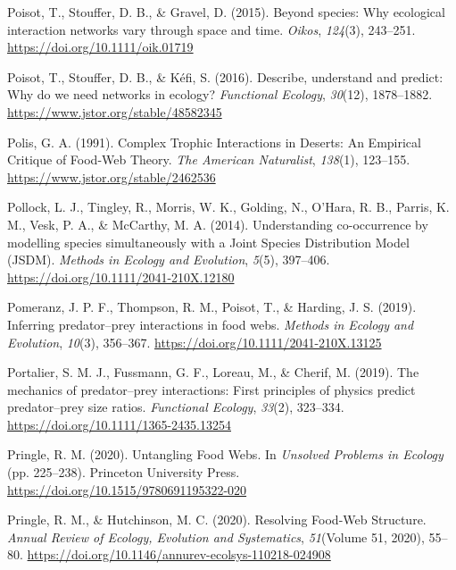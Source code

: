\documentclass[
]{article}
\newlength{\cslhangindent}
\newenvironment{CSLReferences}[2] %
 {\begin{list}{}{%
  \setlength{\itemindent}{0pt}
  \setlength{\leftmargin}{0pt}
  \setlength{\parsep}{0pt}
  \ifodd #1
   \setlength{\leftmargin}{\cslhangindent}
   \setlength{\itemindent}{-1\cslhangindent}
  \fi
  \setlength{\itemsep}{#2\baselineskip}}}
 {\end{list}}
\begin{document}
\begin{CSLReferences}{1}{0}
Poisot, T., Stouffer, D. B., \& Gravel, D. (2015). Beyond species: Why
ecological interaction networks vary through space and time.
\emph{Oikos}, \emph{124}(3), 243--251.
\url{https://doi.org/10.1111/oik.01719}

Poisot, T., Stouffer, D. B., \& Kéfi, S. (2016). Describe, understand
and predict: Why do we need networks in ecology? \emph{Functional
Ecology}, \emph{30}(12), 1878--1882.
\url{https://www.jstor.org/stable/48582345}

Polis, G. A. (1991). Complex {Trophic Interactions} in {Deserts}: {An
Empirical Critique} of {Food-Web Theory}. \emph{The American
Naturalist}, \emph{138}(1), 123--155.
\url{https://www.jstor.org/stable/2462536}

Pollock, L. J., Tingley, R., Morris, W. K., Golding, N., O'Hara, R. B.,
Parris, K. M., Vesk, P. A., \& McCarthy, M. A. (2014). Understanding
co-occurrence by modelling species simultaneously with a {Joint Species
Distribution Model} ({JSDM}). \emph{Methods in Ecology and Evolution},
\emph{5}(5), 397--406. \url{https://doi.org/10.1111/2041-210X.12180}

Pomeranz, J. P. F., Thompson, R. M., Poisot, T., \& Harding, J. S.
(2019). Inferring predator--prey interactions in food webs.
\emph{Methods in Ecology and Evolution}, \emph{10}(3), 356--367.
\url{https://doi.org/10.1111/2041-210X.13125}

Portalier, S. M. J., Fussmann, G. F., Loreau, M., \& Cherif, M. (2019).
The mechanics of predator--prey interactions: {First} principles of
physics predict predator--prey size ratios. \emph{Functional Ecology},
\emph{33}(2), 323--334. \url{https://doi.org/10.1111/1365-2435.13254}

Pringle, R. M. (2020). Untangling {Food Webs}. In \emph{Unsolved
{Problems} in {Ecology}} (pp. 225--238). Princeton University Press.
\url{https://doi.org/10.1515/9780691195322-020}

Pringle, R. M., \& Hutchinson, M. C. (2020). Resolving {Food-Web
Structure}. \emph{Annual Review of Ecology, Evolution and Systematics},
\emph{51}(Volume 51, 2020), 55--80.
\url{https://doi.org/10.1146/annurev-ecolsys-110218-024908}


\end{CSLReferences}
\end{document}
